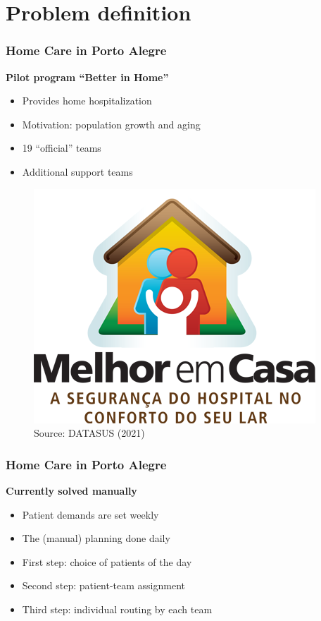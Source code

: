 \section{Problem definition}

\begin{frame}[plain]
   \sectionpage
\end{frame}

\begin{frame}
   \frametitle{Home Care in Porto Alegre}

   \vspace*{8pt}

   \textbf{Pilot program ``Better in Home''}
   \footnotesize
   \begin{itemize}
      \item Provides home hospitalization
      \item Motivation: population growth and aging
      \item 19 ``official'' teams
      \item Additional support teams
   \end{itemize}

   \begin{figure}[H]
      \centering
      \includegraphics[scale=0.15]{fig/melhor-em-casa.png}
      \caption{Source: DATASUS (2021)}
   \end{figure}
\end{frame}

\begin{frame}
   \frametitle{Home Care in Porto Alegre}

   \vspace*{8pt}

   \textbf{Currently solved manually}
   \begin{itemize}
      \item Patient demands are set weekly
      \item The (manual) planning done daily
      \item First step: choice of patients of the day
      \item Second step: patient-team assignment
      \item Third step: individual routing by each team
   \end{itemize}

\end{frame}

